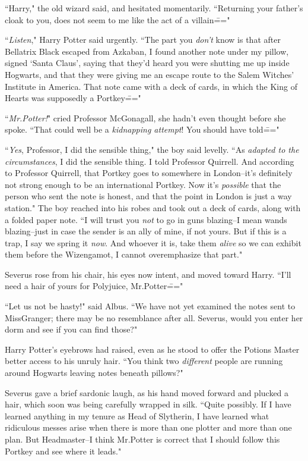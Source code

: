 ``Harry," the old wizard said, and hesitated momentarily. ``Returning your father's cloak to you, does not seem to me like the act of a villain\==="

``\emph{Listen}," Harry Potter said urgently. ``The part you \emph{don't} know is that after Bellatrix Black escaped from Azkaban, I found another note under my pillow, signed `Santa Claus', saying that they'd heard you were shutting me up inside Hogwarts, and that they were giving me an escape route to the Salem Witches' Institute in America. That note came with a deck of cards, in which the King of Hearts was supposedly a Portkey\==="

``\emph{Mr.\?Potter!}" cried Professor McGonagall, she hadn't even thought before she spoke. ``That could well be a \emph{kidnapping attempt}! You should have told\==="

``\emph{Yes}, Professor, I did the sensible thing," the boy said levelly. ``As \emph{adapted to the circumstances}, I did the sensible thing. I told Professor Quirrell. And according to Professor Quirrell, that Portkey goes to somewhere in London\---it's definitely not strong enough to be an international Portkey. Now it's \emph{possible} that the person who sent the note is honest, and that the point in London is just a way station." The boy reached into his robes and took out a deck of cards, along with a folded paper note. ``I will trust you \emph{not} to go in guns blazing\---I mean wands blazing\---just in case the sender is an ally of mine, if not yours. But if this is a trap, I say we spring it \emph{now}. And whoever it is, take them \emph{alive} so we can exhibit them before the Wizengamot, I cannot overemphasize that part."

Severus rose from his chair, his eyes now intent, and moved toward Harry. ``I'll need a hair of yours for Polyjuice, Mr.\?Potter\==="

``Let us not be hasty!" said Albus. ``We have not yet examined the notes sent to Miss\?Granger; there may be no resemblance after all. Severus, would you enter her dorm and see if you can find those?"

Harry Potter's eyebrows had raised, even as he stood to offer the Potions Master better access to his unruly hair. ``You think two \emph{different} people are running around Hogwarts leaving notes beneath pillows?"

Severus gave a brief sardonic laugh, as his hand moved forward and plucked a hair, which soon was being carefully wrapped in silk. ``Quite possibly. If I have learned anything in my tenure as Head of Slytherin, I have learned what ridiculous messes arise when there is more than one plotter and more than one plan. But Headmaster\---I think Mr.\?Potter is correct that I should follow this Portkey and see where it leads."

